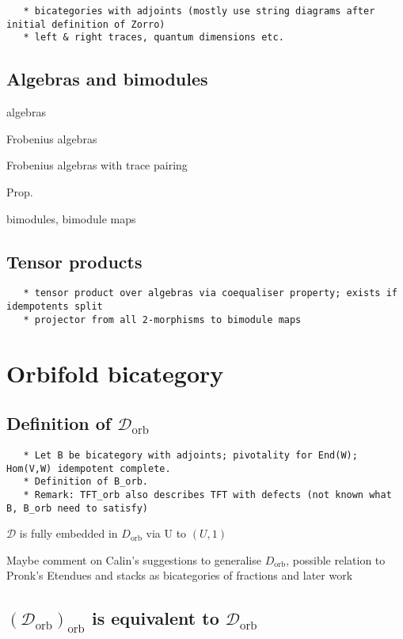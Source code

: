 \documentclass[12pt]{scrartcl}
\theoremstyle{definition}
\numberwithin{equation}{section}
\numberwithin{definition}{section}
\numberwithin{figure}{section}
\begin{document}
\begin{verbatim}
   * bicategories with adjoints (mostly use string diagrams after initial definition of Zorro)
   * left & right traces, quantum dimensions etc. 
\end{verbatim}

\subsection{Algebras and bimodules}

algebras

Frobenius algebras

Frobenius algebras with trace pairing

Prop.

bimodules, bimodule maps

\subsection{Tensor products}

\begin{verbatim}
   * tensor product over algebras via coequaliser property; exists if idempotents split
   * projector from all 2-morphisms to bimodule maps
\end{verbatim}

\section{Orbifold bicategory}

\subsection{Definition of $\mathcal{D}_\mathrm{orb}$}

\begin{verbatim}
   * Let B be bicategory with adjoints; pivotality for End(W); Hom(V,W) idempotent complete. 
   * Definition of B_orb. 
   * Remark: TFT_orb also describes TFT with defects (not known what B, B_orb need to satisfy)
\end{verbatim}

$\mathcal{D}$ is fully embedded in $D_\mathrm{orb}$ via U to $(U,1)$

Maybe comment on Calin's suggestions to generalise $D_\mathrm{orb}$, possible relation to Pronk's Etendues and stacks as bicategories of fractions and later work

\subsection{$(\mathcal{D}_\mathrm{orb})_\mathrm{orb}$ is equivalent to $\mathcal{D}_\mathrm{orb}$}
\end{document}
